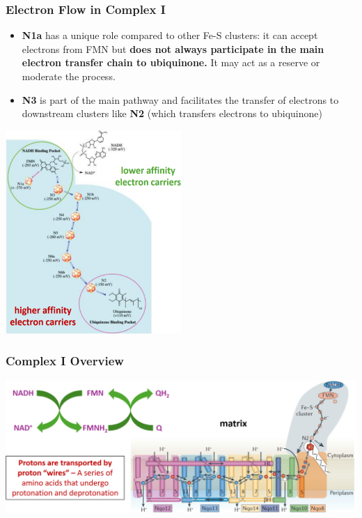 \documentclass[10pt]{article}
\begin{document}
\subsubsection*{Electron Flow in Complex I}
\begin{itemize}
	\item \textbf{N1a} has a unique role compared to other Fe-S clusters: it can accept electrons from FMN but \textbf{does not always participate in the main electron transfer chain to ubiquinone.}  It may act as a reserve or moderate the process.
	\item \textbf{N3} is part of the main pathway and facilitates the transfer of electrons to downstream clusters like \textbf{N2} (which transfers electrons to ubiquinone)
\end{itemize}
\begin{center} 
	\includegraphics*[width=0.5\textwidth]{L2_5.png}
\end{center}

\subsubsection*{Complex I Overview}
\begin{center} 
	\includegraphics*[width=\textwidth]{L2_6.png}
\end{center}
\end{document}

